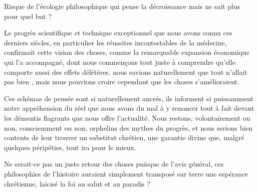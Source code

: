 Risque de l'écologie philosophique qui pense la décroissance mais ne sait plus pour quel but ? 


\begin{singlequote}
        Le progrès scientifique et technique exceptionnel que nous avons connu ces derniers siècles, en particulier les réussites incontestables de la médecine, confirmait cette vision des choses, comme la remarquable expansion économique qui l’a accompagné, dont nous commençons tout juste à comprendre qu’elle comporte aussi des effets délétères. nous savions naturellement que tout n’allait pas bien , mais nous pouvions croire cependant que les choses s’amélioraient.

        Ces schémas de pensée sont si naturellement ancrés, ils informent si puissamment notre appréhension du réel que nous avons du mal à y renoncer tout à fait devant les démentis flagrants que nous offre l’actualité. Nous restons, volontairement ou non, consciemment ou non, orphelins des mythes du progrès, et nous serions bien contents de leur trouver un substitut chrétien, une garantie divine que, malgré quelques péripéties, tout ira pour le mieux.

        Ne serait-ce pas un juste retour des choses puisque de l’avis général, ces philosophies de l’histoire auraient simplement transposé sur terre une espérance chrétienne, laicisé la foi au salut et au paradis ? \cite[pp 89-91]{candiard_quelques_2022}
\end{singlequote}

